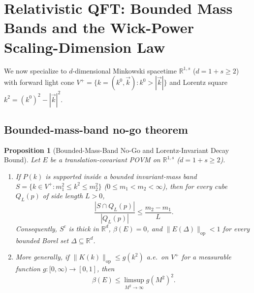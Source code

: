 \documentclass[11pt,a4paper]{article}
\newtheorem{proposition}[theorem]{Proposition}
\theoremstyle{definition}
\theoremstyle{remark}
\newcommand{\RR}{\mathbb{R}}
\newcommand{\op}{\mathrm{op}}
\newcommand{\norm}[1]{\|#1\|}
\begin{document}
\section{Relativistic QFT: Bounded Mass Bands and the Wick-Power Scaling-Dimension Law}
\label{sec:qft}

We now specialize to $d$-dimensional Minkowski spacetime $\RR^{1,s}$ ($d=1+s\ge 2$) with forward light cone $V^+=\{k=(k^0,\vec{k}): k^0>|\vec{k}|\}$ and Lorentz square $k^2=(k^0)^2-|\vec{k}|^2$.

\subsection{Bounded-mass-band no-go theorem}

\begin{proposition}[Bounded-Mass-Band No-Go and Lorentz-Invariant Decay Bound]\label{prop:mass-band}
Let $E$ be a translation-covariant POVM on $\RR^{1,s}$ ($d=1+s\ge 2$).
\begin{enumerate}[label=\textup{(\roman*)},leftmargin=*]
\item If $P(k)$ is supported inside a bounded invariant-mass band $S = \{k\in V^+ : m_1^2\le k^2\le m_2^2\}$ ($0\le m_1<m_2<\infty$), then for every cube $Q_L(p)$ of side length $L>0$,
\begin{equation}\label{eq:mass-band-sharp}
\frac{|S\cap Q_L(p)|}{|Q_L(p)|} \le \frac{m_2 - m_1}{L}.
\end{equation}
Consequently, $S^c$ is thick in $\RR^d$, $\beta(E)=0$, and $\norm{E(\Delta)}_{\op}<1$ for every bounded Borel set $\Delta\subseteq\RR^d$.
\item More generally, if $\norm{K(k)}_{\op}\le g(k^2)$ a.e.\ on $V^+$ for a measurable function $g:[0,\infty)\to[0,1]$, then
\begin{equation}\label{eq:mass-decay}
\beta(E) \le \limsup_{M^2\to\infty} g(M^2)^2.
\end{equation}
\end{enumerate}
\end{proposition}
\end{document}
